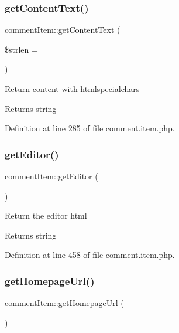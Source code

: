 \subsubsection{\texorpdfstring{get\+Content\+Text()}{getContentText()}}
{\footnotesize\ttfamily comment\+Item\+::get\+Content\+Text (\begin{DoxyParamCaption}\item[{}]{\$strlen = {} }\end{DoxyParamCaption})}

Return content with htmlspecialchars \begin{DoxyReturn}{Returns}
string 
\end{DoxyReturn}


Definition at line 285 of file comment.\+item.\+php.

\mbox{\label{classcommentItem_aa27b1c1916b9df510c495655af07bfdf}} 
\subsubsection{\texorpdfstring{get\+Editor()}{getEditor()}}
{\footnotesize\ttfamily comment\+Item\+::get\+Editor (\begin{DoxyParamCaption}{ }\end{DoxyParamCaption})}

Return the editor html \begin{DoxyReturn}{Returns}
string 
\end{DoxyReturn}


Definition at line 458 of file comment.\+item.\+php.

\mbox{\label{classcommentItem_ad10d90cb7e49989d7a43956886d8e2e8}} 
\subsubsection{\texorpdfstring{get\+Homepage\+Url()}{getHomepageUrl()}}
{\footnotesize\ttfamily comment\+Item\+::get\+Homepage\+Url (\begin{DoxyParamCaption}{ }\end{DoxyParamCaption})}



